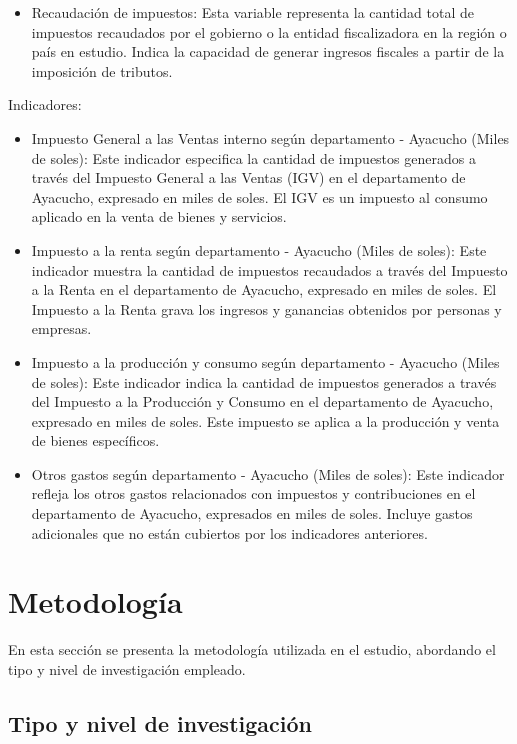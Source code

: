 \documentclass[
  letterpaper,
]{article}
\providecommand{\tightlist}{%
  \setlength{\itemsep}{0pt}\setlength{\parskip}{0pt}}\usepackage{longtable,booktabs,array}
\begin{document}
\begin{itemize}
\tightlist
\item
  Recaudación de impuestos: Esta variable representa la cantidad total
  de impuestos recaudados por el gobierno o la entidad fiscalizadora en
  la región o país en estudio. Indica la capacidad de generar ingresos
  fiscales a partir de la imposición de tributos.
\end{itemize}

Indicadores:

\begin{itemize}
\item
  Impuesto General a las Ventas interno según departamento - Ayacucho
  (Miles de soles): Este indicador especifica la cantidad de impuestos
  generados a través del Impuesto General a las Ventas (IGV) en el
  departamento de Ayacucho, expresado en miles de soles. El IGV es un
  impuesto al consumo aplicado en la venta de bienes y servicios.
\item
  Impuesto a la renta según departamento - Ayacucho (Miles de soles):
  Este indicador muestra la cantidad de impuestos recaudados a través
  del Impuesto a la Renta en el departamento de Ayacucho, expresado en
  miles de soles. El Impuesto a la Renta grava los ingresos y ganancias
  obtenidos por personas y empresas.
\item
  Impuesto a la producción y consumo según departamento - Ayacucho
  (Miles de soles): Este indicador indica la cantidad de impuestos
  generados a través del Impuesto a la Producción y Consumo en el
  departamento de Ayacucho, expresado en miles de soles. Este impuesto
  se aplica a la producción y venta de bienes específicos.
\item
  Otros gastos según departamento - Ayacucho (Miles de soles): Este
  indicador refleja los otros gastos relacionados con impuestos y
  contribuciones en el departamento de Ayacucho, expresados en miles de
  soles. Incluye gastos adicionales que no están cubiertos por los
  indicadores anteriores.
\end{itemize}

\hypertarget{metodologuxeda}{%
\section{Metodología}\label{metodologuxeda}}

En esta sección se presenta la metodología utilizada en el estudio,
abordando el tipo y nivel de investigación empleado.

\hypertarget{tipo-y-nivel-de-investigaciuxf3n}{%
\subsection{Tipo y nivel de
investigación}\label{tipo-y-nivel-de-investigaciuxf3n}}
\end{document}
